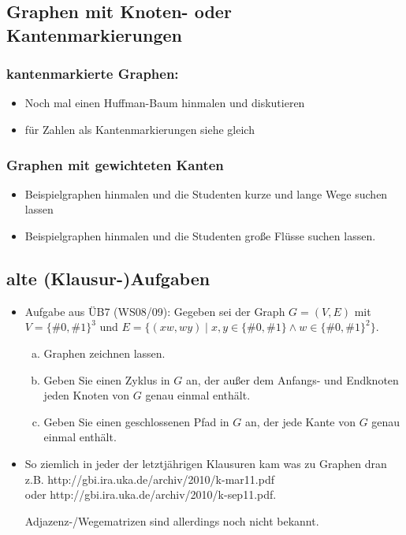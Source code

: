 \documentclass[12pt]{article}
\theoremstyle{margin}
\theoremstyle{margin}
\begin{document}
\subsection{Graphen mit Knoten- oder Kantenmarkierungen}

\subsubsection{kantenmarkierte Graphen:}
  \begin{itemize}
  \item Noch mal einen Huffman-Baum hinmalen und diskutieren
  \item für Zahlen als Kantenmarkierungen siehe gleich
  \end{itemize}

\subsubsection{Graphen mit gewichteten Kanten}
  \begin{itemize}
  \item Beispielgraphen hinmalen und die Studenten kurze und lange
    Wege suchen lassen
  \end{itemize}

  \begin{itemize}
  \item Beispielgraphen hinmalen und die Studenten große Flüsse suchen
    lassen.
  \end{itemize}

\subsection{alte (Klausur-)Aufgaben}
 \begin{itemize}
  \item Aufgabe aus ÜB7 (WS08/09): Gegeben sei der Graph $G=(V, E)$ mit $V=\{\#0, \#1\}^3$ und $E=\{(xw,
  wy) \mid x, y \in \{\#0, \#1\} \land w \in \{\#0, \#1\}^2\}$.

   \begin{enumerate}[a)]
    \item Graphen zeichnen lassen.
    \item Geben Sie einen Zyklus in $G$ an, der außer dem Anfangs- und
      Endknoten jeden Knoten von $G$ genau einmal enthält.
    \item Geben Sie einen geschlossenen Pfad in $G$ an, der jede Kante von $G$
      genau einmal enthält.
  \end{enumerate}
 \item So ziemlich in jeder der letztjährigen Klausuren kam was zu Graphen dran z.B. http://gbi.ira.uka.de/archiv/2010/k-mar11.pdf \\
  oder http://gbi.ira.uka.de/archiv/2010/k-sep11.pdf. 

 Adjazenz-/Wegematrizen sind allerdings noch nicht bekannt.
 \end{itemize}
\end{document}
